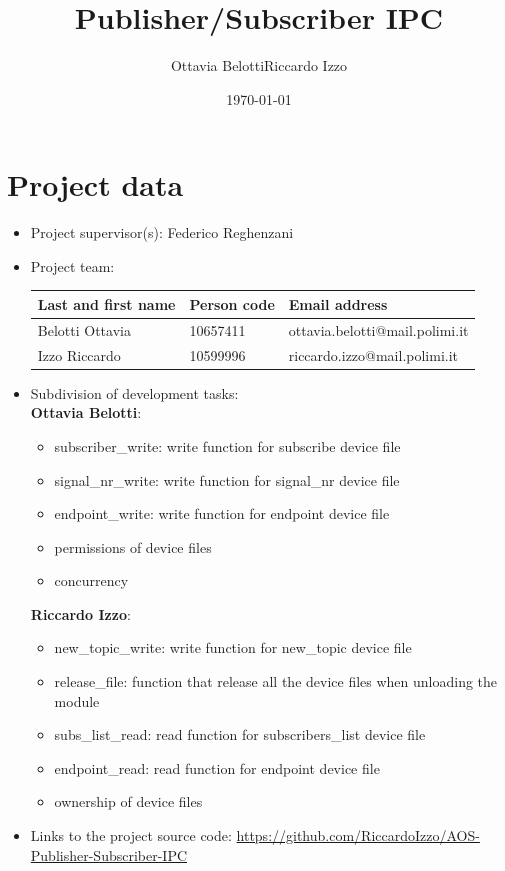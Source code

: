 \documentclass[10pt,a4]{article}
\author{Ottavia Belotti\quad Riccardo Izzo}
\date{\today}
\title{Publisher/Subscriber IPC}
\begin{document}
\maketitle
\tableofcontents

\section{Project data}

\begin{itemize}
\item 
  Project supervisor(s): Federico Reghenzani

\item 
Project team:

\begin{center}
\begin{tabular}{lll}
Last and first name & Person code & Email address\\
\hline
  Belotti Ottavia & 10657411 & ottavia.belotti@mail.polimi.it \\
  Izzo Riccardo & 10599996 & riccardo.izzo@mail.polimi.it                     
\end{tabular}
\end{center}

\item
Subdivision of development tasks:\\
\textbf{Ottavia Belotti}:
\begin{itemize}
  \item subscriber\_write: write function for subscribe device file
  \item signal\_nr\_write: write function for signal\_nr device file
  \item endpoint\_write: write function for endpoint device file
  \item permissions of device files
  \item concurrency
\end{itemize}

\textbf{Riccardo Izzo}:
\begin{itemize}
  \item new\_topic\_write: write function for new\_topic device file
  \item release\_file: function that release all the device files when unloading the module
  \item subs\_list\_read: read function for subscribers\_list device file
  \item endpoint\_read: read function for endpoint device file
  \item ownership of device files
\end{itemize}

\item Links to the project source code: \url{https://github.com/RiccardoIzzo/AOS-Publisher-Subscriber-IPC}

\end{itemize}
\end{document}
